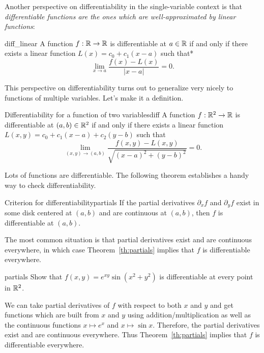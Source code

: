 \documentclass{watsonbook}
\begin{document}
  Another perspective on differentiability in the single-variable
  context is that \textit{differentiable functions are the ones which
    are well-approximated by linear functions}:

  \begin{theo}{}{diff_linear}
    A function $f: \mathbb{R} \to \mathbb{R}$ is differentiable at $a \in \mathbb{R}$ if and
    only if there exists a linear function $L(x) = c_0 + c_1(x-a) $
    such that* 
    \[
      \lim_{x \to a}\frac{f(x) - L(x)}{|x-a|} = 0. 
    \]
  \end{theo}

  This perspective on differentiability turns out to generalize very
  nicely to functions of multiple variables. Let's make it a
  definition.

  \begin{defn}{Differentiability for a function of two variables}{diff}
    A function $f: \mathbb{R}^2 \to \mathbb{R}$ is differentiable at $(a,b) \in \mathbb{R}^2$
    if and only if there exists a linear function
    $L(x,y) = c_0 + c_{1}(x-a) + c_{2}(y-b)$ such that
    \[
      \lim_{(x,y) \to (a,b)}\frac{f(x,y) - L(x,y)}{\sqrt{(x-a)^2 + (y-b)^2}} = 0. 
    \]
  \end{defn}

  Lots of functions are differentiable. The following theorem
  establishes a handy way to check differentiability. 

  \begin{theo}{Criterion for differentiability}{partials} 
    If the partial derivatives $\partial_x f$ and $\partial_y f$ exist
    in some disk centered at $(a,b)$ and are continuous at $(a,b)$, then
    $f$ is differentiable at $(a,b)$. 
  \end{theo}

  The most common situation is that partial derivatives exist and are
  continuous everywhere, in which case Theorem~\ref{th:partials}
  implies that $f$ is differentiable everywhere.

  \begin{example}{}{partials}
    Show that $f(x,y) = e^{xy} \sin (x^2 + y^2)$ is differentiable at
    every point in $\mathbb{R}^2$. 
  \end{example}

  \begin{solution}
    We can take partial derivatives of $f$ with respect to both $x$
    and $y$ and get functions which are built from $x$ and $y$ using
    addition/multiplication as well as the continuous functions
    $x\mapsto e^x$ and $x\mapsto \sin x$. Therefore, the partial
    derivatives exist and are continuous everywhere. Thus
    Theorem~\ref{th:partials} implies that $f$ is differentiable
    everywhere. 
  \end{solution}
\end{document}
